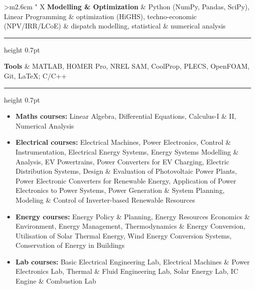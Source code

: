 \documentclass[10pt]{article}
\makeatletter
\newcommand{\thickhline}{%
    \noalign {\ifnum 0=`}\fi \hrule height 0.7pt
    \futurelet \reserved@a \@xhline
}
\newcommand{\xfill}[2][1ex]{
	\dimen0=#2\advance\dimen0 by #1
	\leaders\hrule height \dimen0 depth -#1\hfill
}
\renewcommand{\section}[1]{
	\vspace{4pt}
	{\color{RoyalBlue}{\Large\scshape\raggedright #1\xfill[0pt]{0.5pt}}}
}
\makeatother
\begin{document}
\section{Technical Skills}

\vspace{3pt}
\begin{tabularx}{\textwidth}{>{\centering\arraybackslash}m{2.6cm} " X}
\textbf{Modelling \& Optimization} & Python (NumPy, Pandas, SciPy), Linear Programming \& optimization (HiGHS), techno-economic (NPV/IRR/LCoE) \& dispatch modelling, statistical \& numerical analysis \\ \thickhline
\textbf{Tools} & MATLAB, HOMER Pro, NREL SAM, CoolProp, PLECS, OpenFOAM, Git, \LaTeX; C/C++ \\ \thickhline
\end{tabularx}

\section{Key Courses}

\vspace{2pt}
\begin{itemize}
	\item \textbf{Maths courses:} Linear Algebra, Differential Equations, Calculus-I \& II, Numerical Analysis
	\item \textbf{Electrical courses:} Electrical Machines, Power Electronics, Control \& Instrumentation, Electrical Energy Systems, Energy Systems Modelling \& Analysis, EV Powertrains, Power Converters for EV Charging, Electric Distribution Systems, Design \& Evaluation of Photovoltaic Power Plants, Power Electronic Converters for Renewable Energy, Application of Power Electronics to Power Systems, Power Generation \& System Planning, Modeling \& Control of Inverter-based Renewable Resources
	\item \textbf{Energy courses:} Energy Policy \& Planning, Energy Resources Economics \& Environment, Energy Management, Thermodynamics \& Energy Conversion, Utilisation of Solar Thermal Energy, Wind Energy Conversion Systems, Conservation of Energy in Buildings
	\item \textbf{Lab courses:} Basic Electrical Engineering Lab, Electrical Machines \& Power Electronics Lab, Thermal \& Fluid Engineering Lab, Solar Energy Lab, IC Engine \& Combustion Lab
\end{itemize}
\end{document}
